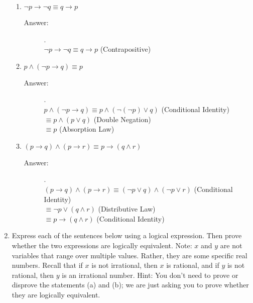 \documentclass[12pt, oneside]{article}
\begin{document}
\begin{enumerate}
\begin{enumerate}
    \item $\neg p \to \neg q \equiv q \to p$
    \begin{description}
        \item[Answer:] .\\
        $\lnot p \rightarrow \lnot q \equiv q \rightarrow p$ (Contrapositive)
    \end{description}
    \item $p \land (\neg p \to q) \equiv p$
    \begin{description}
        \item[Answer:] .\\
        $p \land (\lnot p \rightarrow q) \equiv p \land (\lnot(\lnot p) \lor q)$ (Conditional Identity)\\
        $\equiv p \land (p \lor q)$ (Double Negation)\\
        $\equiv p$ (Absorption Law)
    \end{description}
    \item $(p \to q) \land (p \to r) \equiv p \to (q \land r)$
    \begin{description}
        \item[Answer:] .\\
        $(p \to q) \land (p \to r) \equiv (\lnot p \lor q) \land (\lnot p \lor r)$ (Conditional Identity)\\
        $\equiv \lnot p \lor (q \land r)$ (Distributive Law)\\
        $\equiv p \rightarrow (q \land r)$ (Conditional Identity)
    \end{description}
\end{enumerate}


\item Express each of the sentences below using a logical expression. Then prove whether the two expressions are logically equivalent. Note: $x$ and $y$ are not variables that range over multiple values. Rather, they are some specific real numbers. Recall that if $x$ is not irrational, then $x$ is rational, and if $y$ is not rational, then $y$ is an irrational number. Hint: You don't need to prove or disprove the statements (a) and (b); we are just asking you to prove whether they are logically equivalent.


\end{enumerate}
\end{document}
